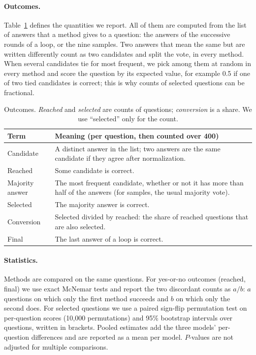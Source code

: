 \documentclass[11pt]{article}
\begin{document}
\paragraph{Outcomes.}
Table~\ref{tab:terms} defines the quantities we report.
All of them are computed from the list of answers that a method gives to a question: the answers of the successive rounds of a loop, or the nine samples.
Two answers that mean the same but are written differently count as two candidates and split the vote, in every method.
When several candidates tie for most frequent, we pick among them at random in every method and score the question by its expected value, for example 0.5 if one of two tied candidates is correct; this is why counts of selected questions can be fractional.

\begin{table}[t]
\centering
\small
\setlength{\tabcolsep}{3pt}
\begin{tabular}{@{}lp{5.6cm}@{}}
\toprule
Term & Meaning (per question, then counted over 400) \\
\midrule
Candidate & A distinct answer in the list; two answers are the same candidate if they agree after normalization. \\
Reached & Some candidate is correct. \\
Majority answer & The most frequent candidate, whether or not it has more than half of the answers (for samples, the usual majority vote). \\
Selected & The majority answer is correct. \\
Conversion & Selected divided by reached: the share of reached questions that are also selected. \\
Final & The last answer of a loop is correct. \\
\bottomrule
\end{tabular}
\caption{Outcomes. \emph{Reached} and \emph{selected} are counts of questions; \emph{conversion} is a share. We use ``selected'' only for the count.}
\label{tab:terms}
\end{table}

\paragraph{Statistics.}
Methods are compared on the same questions.
For yes-or-no outcomes (reached, final) we use exact McNemar tests and report the two discordant counts as $a/b$: $a$ questions on which only the first method succeeds and $b$ on which only the second does.
For selected questions we use a paired sign-flip permutation test on per-question scores (10{,}000 permutations) and 95\% bootstrap intervals over questions, written in brackets.
Pooled estimates add the three models' per-question differences and are reported as a mean per model.
$P$-values are not adjusted for multiple comparisons.
\end{document}
